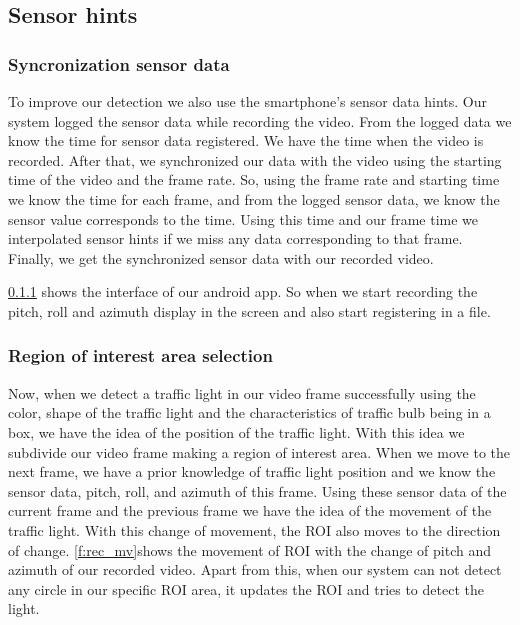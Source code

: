 \subsection{Sensor hints}
\subsubsection{Syncronization sensor data}
To improve our detection we also use the smartphone's sensor data hints.
Our system logged the sensor data while recording the video.
From the logged data we know the time for sensor data registered.
We have the time when the video is recorded.
After that, we synchronized our data with the video using the starting time of the video and the frame rate.
So, using the frame rate and starting time we know the time for each frame, and from the logged sensor data, we know the sensor value corresponds to the time.
Using this time and our frame time we interpolated sensor hints if we miss any data corresponding to that frame.
Finally, we get the synchronized sensor data with our recorded video.

\ref{} shows the interface of our android app.
So when we start recording the pitch, roll and azimuth display in the screen and also start registering in a file.

\subsubsection{Region of interest area selection}
\label{s:roi}
Now, when we detect a traffic light in our video frame successfully using the color, shape of the traffic light and the characteristics of traffic bulb being in a box, we have the idea of the position of the traffic light.
With this idea we subdivide our video frame making a region of interest area.
When we move to the next frame, we have a prior knowledge of traffic light position and we know the sensor data, pitch, roll, and azimuth of this frame.
Using these sensor data of the current frame and the previous frame we have the idea of the movement of the traffic light.
With this change of movement, the ROI also moves to the direction of change.
\ref{f:rec_mv}shows the movement of ROI with the change of pitch and azimuth of our recorded video.
Apart from this, when our system can not detect any circle in our specific ROI area, it updates the ROI and tries to detect the light.

